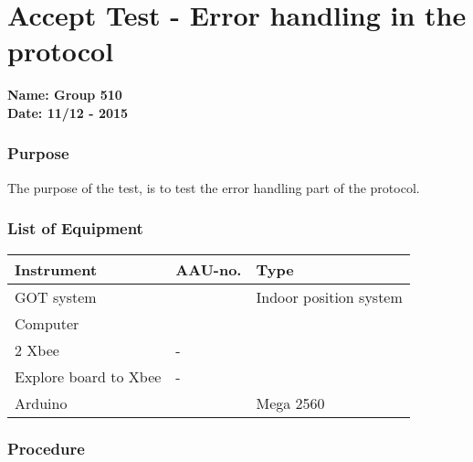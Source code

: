 \pagebreak
\section{Accept Test - Error handling in the protocol} \label{app:AccTes2}
\textbf{Name: Group 510}\\
\textbf{Date: 11/12 - 2015}

\subsubsection{Purpose}
The purpose of the test, is to test the error handling part of the protocol.

\subsubsection{List of Equipment}
\begin{table}[H]
\begin{tabular}{|l|l|p{4cm}|}
\hline%
  \textbf{Instrument}                        &  \textbf{AAU-no.}  &  \textbf{Type}       \\
\hline%
  GOT system                               &   &  Indoor position system  \\
\hline%
  Computer                   		         &   &    \\
\hline%
  2 Xbee &  -             &    \\
\hline%
  Explore board to Xbee                 &  -             &                      \\
\hline
 Arduino & & Mega 2560 \\
\hline
\end{tabular}
\end{table}

\subsubsection{Procedure}

